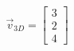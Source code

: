 \documentclass[preview]{standalone}
\begin{document}
\begin{align*}
\vec{v}_{3D} = \begin{bmatrix} 3 \\ 2 \\ 4 \end{bmatrix}
\end{align*}
\end{document}
